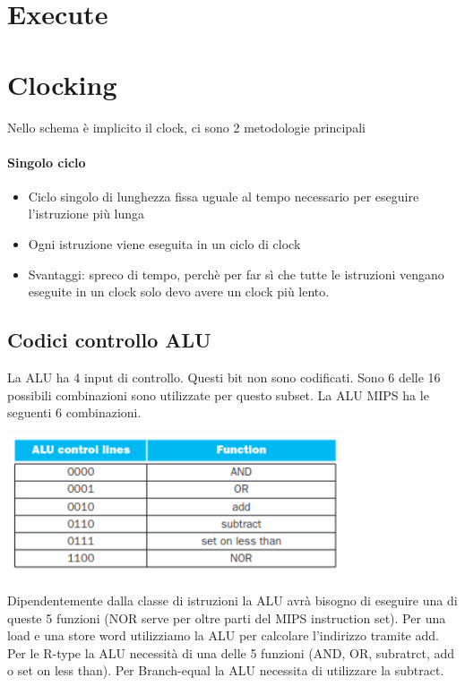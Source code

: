 \documentclass[12pt, a4paper, openany]{book}
\begin{document}
\section*{Execute}
\section*{Clocking}
Nello schema è implicito il clock, ci sono 2 metodologie principali
\paragraph*{Singolo ciclo} \begin{itemize}
    \item Ciclo singolo di lunghezza fissa uguale al tempo necessario per eseguire l'istruzione
    più lunga
    \item Ogni istruzione viene eseguita in un ciclo di clock
    \item Svantaggi: spreco di tempo, perchè per far sì che tutte le istruzioni vengano eseguite in 
    un clock solo devo avere un clock più lento.
\end{itemize}
\subsection*{Codici controllo ALU}
La ALU ha 4 input di controllo. Questi bit non sono codificati.
Sono 6 delle 16 possibili combinazioni sono utilizzate per questo subset. La ALU 
MIPS ha le seguenti 6 combinazioni.
\begin{center}
    \includegraphics[width=100mm, scale=0.5]{ALU Control.png}
\end{center}
Dipendentemente dalla classe di istruzioni la ALU avrà bisogno di eseguire
una di queste 5 funzioni (NOR serve per oltre parti del MIPS instruction set).
Per una load e una store word utilizziamo la ALU per calcolare l'indirizzo tramite add.
Per le R-type la ALU necessità di una delle 5 funzioni (AND, OR, subratrct, add o set on less than).
Per Branch-equal la ALU necessita di utilizzare la subtract.
\end{document}
